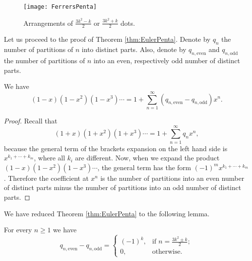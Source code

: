 \begin{page}
\begin{figure}[ht]
\begin{center}
\texttt{[image: FerrersPenta]}
\end{center}
\caption{Arrangements of $\frac{3k^2 - k}{2}$ or $\frac{3k^2 + k}{2}$ dots.}
\label{fig:FerrersPenta}
\end{figure}


Let us proceed to the proof of Theorem \ref{thm:EulerPenta}.
Denote by $q_n$ the number of partitions of $n$ into distinct parts.
Also, denote by $q_{n,\mathrm{even}}$ and $q_{n,\mathrm{odd}}$ the number of partitions of $n$ into an even,
respectively odd number of distinct parts.


\end{page}

\begin{page}
\setcounter{section}{3}
\setcounter{subsection}{8}
\setcounter{dfn}{21}
\label{portion:849}

\begin{lem}
We have
\[
(1-x)(1-x^2)(1-x^3) \cdots = 1 + \sum_{n=1}^\infty (q_{n,\mathrm{even}} - q_{n,\mathrm{odd}})x^n.
\]
\end{lem}

\end{page}

\begin{page}
\setcounter{section}{3}
\setcounter{subsection}{8}
\setcounter{dfn}{21}
\label{portion:850}

\begin{proof}
Recall that
\[
(1+x)(1+x^2)(1+x^3) \cdots = 1 + \sum_{n=1}^\infty q_n x^n,
\]
because the general term of the brackets expansion on the left hand side is $x^{k_1 + \cdots + k_m}$, where all $k_i$ are different.
Now, when we expand the product $(1-x)(1-x^2)(1-x^3)\cdots$, the general term has the form $(-1)^m x^{k_1 + \cdots + k_m}$.
Therefore the coefficient at $x^n$ is the number of partitions into an even number of distinct parts
minus the number of partitions into an odd number of distinct parts.
\end{proof}

We have reduced Theorem \ref{thm:EulerPenta} to the following lemma.

\end{page}

\begin{page}
\setcounter{section}{3}
\setcounter{subsection}{8}
\setcounter{dfn}{22}
\label{portion:852}

\begin{lem}
For every $n \ge 1$ we have
\[
q_{n,\mathrm{even}} - q_{n, \mathrm{odd}} =
\begin{cases}
(-1)^k, &\text{if } n = \frac{3k^2 \pm k}2;\\
0, &\text{otherwise.}
\end{cases}
\]
\end{lem}

\end{page}

